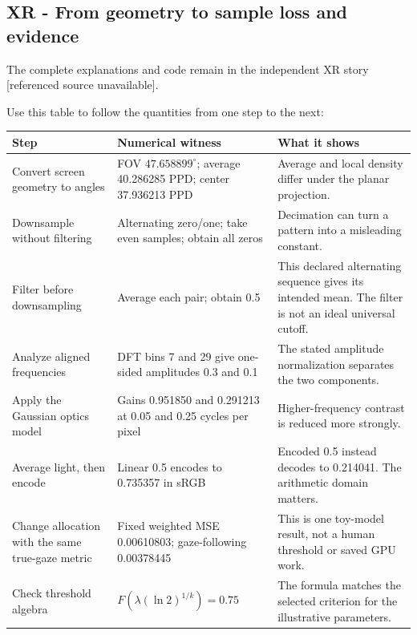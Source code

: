 \subsection{XR - From geometry to sample loss and evidence}\label{appendix-92ff77d4dfdc-xr---from-geometry-to-sample-loss-and-evidence}

The complete explanations and code remain in {the independent XR story {[}referenced source unavailable{]}}.

Use this table to follow the quantities from one step to the next:

{\def\LTcaptype{none} %
\begin{longtable}[]{@{}
  >{\raggedright\arraybackslash}p{}
  >{\raggedright\arraybackslash}p{}
  >{\raggedright\arraybackslash}p{}@{}}
\toprule\noalign{}
\begin{minipage}[b]{\linewidth}\raggedright
Step
\end{minipage} & \begin{minipage}[b]{\linewidth}\raggedright
Numerical witness
\end{minipage} & \begin{minipage}[b]{\linewidth}\raggedright
What it shows
\end{minipage} \\
\midrule\noalign{}
\endhead
\bottomrule\noalign{}
\endlastfoot
Convert screen geometry to angles & FOV \(47.658899^\circ\); average 40.286285 PPD; center 37.936213 PPD & Average and local density differ under the planar projection. \\
Downsample without filtering & Alternating zero/one; take even samples; obtain all zeros & Decimation can turn a pattern into a misleading constant. \\
Filter before downsampling & Average each pair; obtain 0.5 & This declared alternating sequence gives its intended mean. The filter is not an ideal universal cutoff. \\
Analyze aligned frequencies & DFT bins 7 and 29 give one-sided amplitudes 0.3 and 0.1 & The stated amplitude normalization separates the two components. \\
Apply the Gaussian optics model & Gains 0.951850 and 0.291213 at 0.05 and 0.25 cycles per pixel & Higher-frequency contrast is reduced more strongly. \\
Average light, then encode & Linear 0.5 encodes to 0.735357 in sRGB & Encoded 0.5 instead decodes to 0.214041. The arithmetic domain matters. \\
Change allocation with the same true-gaze metric & Fixed weighted MSE 0.00610803; gaze-following 0.00378445 & This is one toy-model result, not a human threshold or saved GPU work. \\
Check threshold algebra & \(F\!\left(\lambda(\ln2)^{1/k}\right)=0.75\) & The formula matches the selected criterion for the illustrative parameters. \\
\end{longtable}
}

